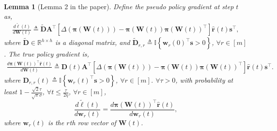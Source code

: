 \documentclass[10pt]{article}
\def\rvr{{\mathbf{r}}}
\def\rvs{{\mathbf{s}}}
\def\rvw{{\mathbf{w}}}
\newtheorem{lem}{Lemma}
\def\rvpi{{\boldsymbol{\pi}}}
\def\rmA{{\mathbf{A}}}
\def\rmD{{\mathbf{D}}}
\def\rmW{{\mathbf{W}}}
\def\sR{{\mathbb{R}}}
\def\sI{{\mathbb{I}}}
\begin{document}
\begin{lem}[Lemma 2 in the paper]
\label{lem:gradient_coupling}
	Define the pseudo policy gradient at step $t$ as,
\begin{equation*}
\begin{split}
	\frac{d \tilde{\ell}(t)}{d \rmW(t)} \triangleq \tilde{\rmD} \rmA^\top \left[ \Delta\left( \rvpi\left(\rmW(t)\right) \right) - \rvpi\left(\rmW(t)\right) \rvpi\left(\rmW(t)\right)^\top \right] \hat{\rvr}\left(t\right) \rvs^\top,
\end{split}
\end{equation*}
where $\tilde{\rmD} \in \sR^{h \times h}$ is a diagonal matrix, and $\tilde{\rmD}_{r,r} \triangleq \sI\left\{ \rvw_r(0)^\top \rvs > 0 \right\}$, $\forall r \in [m]$. The true policy gradient is,
\begin{equation*}
\begin{split}
    \frac{d \rvpi\left(\rmW(t)\right)^\top \hat{\rvr}\left(t\right)}{d \rmW(t)} \triangleq  \rmD(t) \rmA^\top \left[ \Delta\left( \rvpi\left(\rmW(t)\right) \right) - \rvpi\left(\rmW(t)\right) \rvpi\left(\rmW(t)\right)^\top \right] \hat{\rvr}\left(t\right) \rvs^\top.
\end{split}
\end{equation*}
where $\rmD_{r,r}(t) \triangleq \sI\left\{ \rvw_r(t)^\top \rvs > 0 \right\}$, $\forall r \in [m]$. $\forall \tau > 0$, with probability at least $1 - \frac{\sqrt{2}\tau}{\sqrt{\pi}\sigma}$, $\forall t \le \frac{\tau}{ 2 \eta }$, $\forall r \in [m]$,
\begin{equation*}
	\frac{d\tilde{\ell}(t)}{d \rvw_r(t)} = \frac{d \rvpi\left(\rmW(t)\right)^\top \hat{\rvr}\left(t\right)}{d \rvw_r(t)},
\end{equation*}
where $\rvw_r(t)$ is the $r$th row vector of $\rmW(t)$.
\end{lem}
\end{document}
